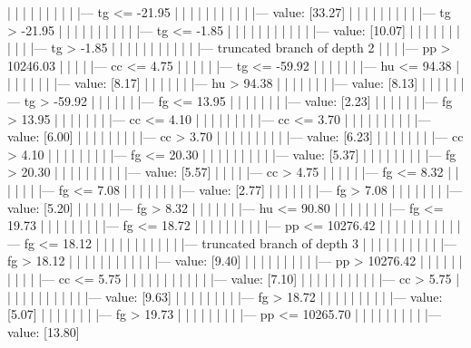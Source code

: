 \documentclass[UTF8, a4paper]{ctexart}
\begin{document}
|   |   |   |   |   |   |   |   |   |--- tg <= -21.95
|   |   |   |   |   |   |   |   |   |   |--- value: [33.27]
|   |   |   |   |   |   |   |   |   |--- tg >  -21.95
|   |   |   |   |   |   |   |   |   |   |--- tg <= -1.85
|   |   |   |   |   |   |   |   |   |   |   |--- value: [10.07]
|   |   |   |   |   |   |   |   |   |   |--- tg >  -1.85
|   |   |   |   |   |   |   |   |   |   |   |--- truncated branch of depth 2
|   |   |   |--- pp >  10246.03
|   |   |   |   |--- cc <= 4.75
|   |   |   |   |   |--- tg <= -59.92
|   |   |   |   |   |   |--- hu <= 94.38
|   |   |   |   |   |   |   |--- value: [8.17]
|   |   |   |   |   |   |--- hu >  94.38
|   |   |   |   |   |   |   |--- value: [8.13]
|   |   |   |   |   |--- tg >  -59.92
|   |   |   |   |   |   |--- fg <= 13.95
|   |   |   |   |   |   |   |--- value: [2.23]
|   |   |   |   |   |   |--- fg >  13.95
|   |   |   |   |   |   |   |--- cc <= 4.10
|   |   |   |   |   |   |   |   |--- cc <= 3.70
|   |   |   |   |   |   |   |   |   |--- value: [6.00]
|   |   |   |   |   |   |   |   |--- cc >  3.70
|   |   |   |   |   |   |   |   |   |--- value: [6.23]
|   |   |   |   |   |   |   |--- cc >  4.10
|   |   |   |   |   |   |   |   |--- fg <= 20.30
|   |   |   |   |   |   |   |   |   |--- value: [5.37]
|   |   |   |   |   |   |   |   |--- fg >  20.30
|   |   |   |   |   |   |   |   |   |--- value: [5.57]
|   |   |   |   |--- cc >  4.75
|   |   |   |   |   |--- fg <= 8.32
|   |   |   |   |   |   |--- fg <= 7.08
|   |   |   |   |   |   |   |--- value: [2.77]
|   |   |   |   |   |   |--- fg >  7.08
|   |   |   |   |   |   |   |--- value: [5.20]
|   |   |   |   |   |--- fg >  8.32
|   |   |   |   |   |   |--- hu <= 90.80
|   |   |   |   |   |   |   |--- fg <= 19.73
|   |   |   |   |   |   |   |   |--- fg <= 18.72
|   |   |   |   |   |   |   |   |   |--- pp <= 10276.42
|   |   |   |   |   |   |   |   |   |   |--- fg <= 18.12
|   |   |   |   |   |   |   |   |   |   |   |--- truncated branch of depth 3
|   |   |   |   |   |   |   |   |   |   |--- fg >  18.12
|   |   |   |   |   |   |   |   |   |   |   |--- value: [9.40]
|   |   |   |   |   |   |   |   |   |--- pp >  10276.42
|   |   |   |   |   |   |   |   |   |   |--- cc <= 5.75
|   |   |   |   |   |   |   |   |   |   |   |--- value: [7.10]
|   |   |   |   |   |   |   |   |   |   |--- cc >  5.75
|   |   |   |   |   |   |   |   |   |   |   |--- value: [9.63]
|   |   |   |   |   |   |   |   |--- fg >  18.72
|   |   |   |   |   |   |   |   |   |--- value: [5.07]
|   |   |   |   |   |   |   |--- fg >  19.73
|   |   |   |   |   |   |   |   |--- pp <= 10265.70
|   |   |   |   |   |   |   |   |   |--- value: [13.80]
\end{document}
